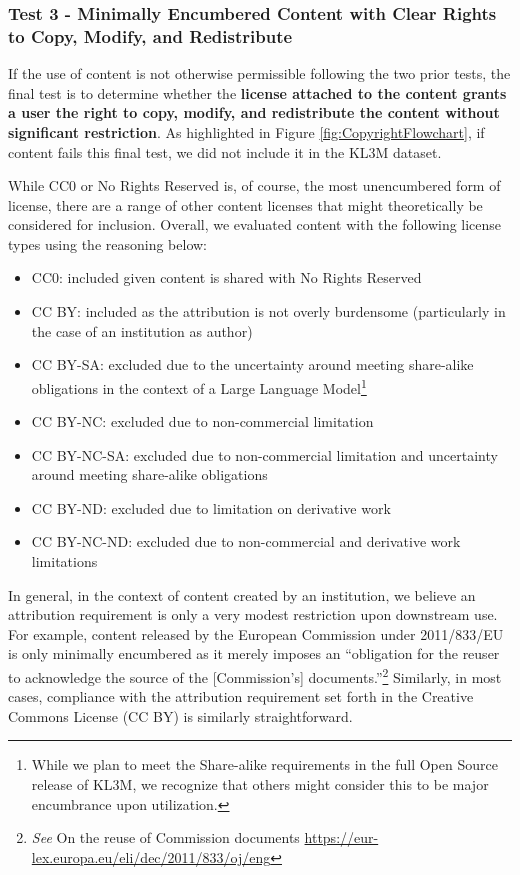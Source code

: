 \subsubsection{Test 3 - Minimally Encumbered Content with Clear Rights to Copy, Modify, and Redistribute}
If the use of content is not otherwise permissible following the two prior tests, the final test is to determine whether the \textbf{license attached to the content grants a user the right to copy, modify, and redistribute the content without significant restriction}.  As highlighted in Figure \ref{fig:CopyrightFlowchart}, if content fails this final test, we did not include it in the KL3M dataset.

While CC0 or No Rights Reserved is, of course, the most unencumbered form of license, there are a range of other content licenses that might theoretically be considered for inclusion.   Overall, we evaluated content with the following license types using the reasoning below:

\begin{itemize}
\item CC0: included given content is shared with No Rights Reserved 
\item CC BY: included as the attribution is not overly burdensome (particularly in the case of an institution as author)
\item CC BY-SA: excluded due to the uncertainty around meeting share-alike obligations in the context of a Large Language Model\footnote{While we plan to meet the Share-alike requirements in the full Open Source release of KL3M, we recognize that others might consider this to be major encumbrance upon utilization.}
\item CC BY-NC: excluded due to non-commercial limitation
\item CC BY-NC-SA: excluded due to non-commercial limitation and uncertainty around meeting share-alike obligations
\item CC BY-ND: excluded due to limitation on derivative work
\item CC BY-NC-ND: excluded due to non-commercial and derivative work limitations
\end{itemize}

In general, in the context of content created by an institution, we believe an attribution requirement is only a very modest restriction upon downstream use.  For example, content released by the European Commission under 2011/833/EU is only minimally encumbered as it merely imposes an ``obligation for the reuser to acknowledge the source of the [Commission's] documents.''\footnote{\textit{See} On the reuse of Commission documents \url{https://eur-lex.europa.eu/eli/dec/2011/833/oj/eng}}  Similarly, in most cases, compliance with the attribution requirement set forth in the Creative Commons License (CC BY) is similarly straightforward.  

